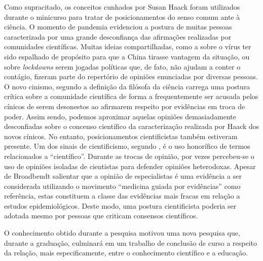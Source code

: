 \documentclass[12pt]{report}
\begin{document}
	Como supracitado, os conceitos cunhados por Susan Haack foram utilizados durante o minicurso para tratar de posicionamentos do senso comum ante à ciência.
	O momento de pandemia evidenciou a postura de muitas pessoas caracterizada por uma grande desconfiança das afirmações realizadas por comunidades científicas.
	Muitas ideias compartilhadas, como a sobre o vírus ter sido espalhado de propósito para que a China tirasse vantagem da situação, ou sobre \textit{lockdowns} serem jogadas políticas que, de fato, não ajudam a conter o contágio, fizeram parte do repertório de opiniões enunciadas por diversas pessoas.
	O novo cinismo, segundo a definição da filósofa da ciência carrega uma postura crítica sobre a comunidade científica de forma a frequentemente ser acusada pelos cínicos de serem desonestos ao afirmarem respeito por evidências em troca de poder.
	Assim sendo, podemos aproximar aquelas opiniões demasiadamente desconfiadas sobre o concenso científico da caracterização realizada por Haack dos novos cínicos.
	No entanto, posicionamentos cientificistas também estiveram presente.
	Um dos sinais de cientificismo, segundo \textcite{haack-six-signs}, é o uso honorífico de termos relacionados a ``científico''.
	Durante as trocas de opinião, por vezes percebeu-se o uso de opiniões isoladas de cientistas para defender opiniões heterodoxas.
	Apesar de Broadbendt salientar que a opinião de especialistas é uma evidência a ser considerada utilizando o movimento ``medicina guiada por evidências'' como referência, estas constituem a classe das evidências mais fracas em relação a estudos epidemiológicos.
	Deste modo, uma postura cientificista poderia ser adotada mesmo por pessoas que criticam consensos científicos.
	
	O conhecimento obtido durante a pesquisa motivou uma nova pesquisa que, durante a graduação, culminará em um trabalho de conclusão de curso a respeito da relação, mais especificamente, entre o conhecimento científico e a educação.
	
	\newpage
	\vspace*{-3cm}
	\printbibliography
	
\end{document}
